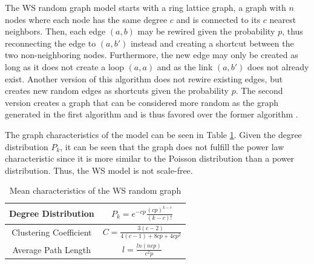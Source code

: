 The WS random graph model starts with a ring lattice graph, a graph 
with $n$ nodes where each node has the same degree $c$ and 
is connected to its $c$ nearest neighbors. Then, each edge $(a, b)$
may be rewired given the probability $p$, thus reconnecting the edge to  $(a, b')$
instead and creating a shortcut between the two non-neighboring nodes.
Furthermore, the new edge may only be created as long as it does not create
a loop $(a, a)$ and as the link $(a, b')$ does not already exist.
Another version of this algorithm does not rewire existing edges,
but creates new random edges as shortcuts given the probability $p$.
The second version creates a graph that can be considered more 
\glqq random\grqq{} as the graph generated in the first algorithm and is
thus favored over the former algorithm \cite{basicnetwork}.

The graph characteristics of the model can be seen
in Table \ref{ws-model}. Given the degree distribution $P_k$, it can be seen
that the graph does not fulfill the power law characteristic
since it is more similar
to the Poisson distribution than a power distribution. Thus, the WS model
is not scale-free.

\begin{table}[ht!]
    \centering
    \begin{tabular}{|c | c |} 
     \hline
     Degree Distribution & 
     $P_k = e^{-cp}\frac{(cp)^{k-c}}{(k-c)!}$ \\ 
     \hline
     Clustering Coefficient & 
     $C=\frac{3(c-2)}{4(c-1) + 8cp +4cp^2}$ \\ 
     \hline
     Average Path Length & $l = \frac{ln(ncp)}{c^2p}$ \\ 
     \hline
    \end{tabular}
    \caption{Mean characteristics of the WS random graph \cite{basicnetwork}}
    \label{ws-model}
\end{table}



